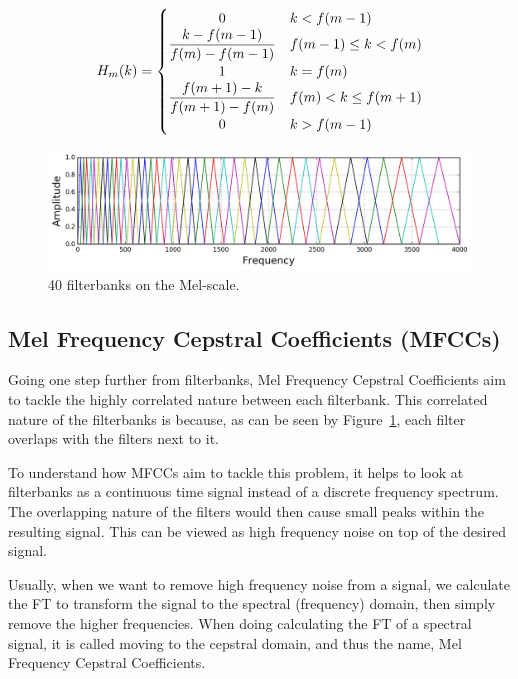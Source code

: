 \begin{equation}
    H_m(k) =
  \begin{cases}
      \hfil 0 & k < f(m - 1) \\
      \dfrac{k - f(m - 1)}{f(m) - f(m - 1)} & f(m - 1) \leq k < f(m) \\
      \hfil {1} & k = f(m) \\
      \dfrac{f(m + 1) - k}{f(m + 1) - f(m)} & f(m) < k \leq f(m + 1) \\
      \hfil {0} & k > f(m - 1) \\
  \end{cases}
\end{equation}

\begin{figure}[h]
    \centering
    \includegraphics[width=0.9\linewidth]{content/fig/mel_filters.jpg}
    \caption{40 filterbanks on the Mel-scale.}
    \label{fig:mel_filters}
\end{figure}

\subsection{Mel Frequency Cepstral Coefficients (MFCCs)}

Going one step further from filterbanks, Mel Frequency Cepstral Coefficients aim to tackle the highly correlated nature between each filterbank. 
This correlated nature of the filterbanks is because, as can be seen by Figure~\ref{fig:mel_filters}, each filter overlaps with the filters next to it.

To understand how MFCCs aim to tackle this problem, it helps to look at filterbanks as a continuous time signal instead of a discrete frequency spectrum.
The overlapping nature of the filters would then cause small peaks within the resulting signal. 
This can be viewed as high frequency noise on top of the desired signal.

Usually, when we want to remove high frequency noise from a signal, we calculate the FT to transform the signal to the spectral (frequency) domain, then simply remove the higher frequencies. 
When doing calculating the FT of a spectral signal, it is called moving to the cepstral domain, and thus the name, Mel Frequency Cepstral Coefficients.

